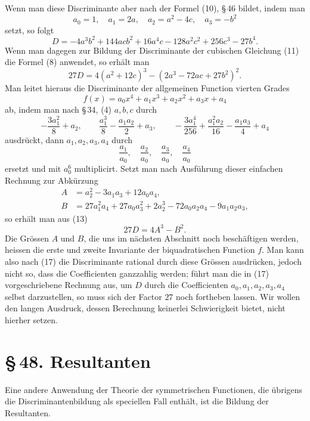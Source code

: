 \documentclass[11pt]{article}
\providecommand{\sect}[2]{\section*{\S\,#1. #2}}
\begin{document}
Wenn man diese Discriminante aber nach der Formel (10), \S\,46 bildet, indem man
\[
 a_0=1,\quad a_1=2a,\quad a_2=a^2-4c,\quad a_3=-b^2
\]
setzt, so folgt
\begin{equation}
D=-4a^3b^2+144acb^2+16a^4c-128a^2c^2+256c^3-27b^4.
\tag{12}
\end{equation}
Wenn man dagegen zur Bildung der Discriminante der cubischen Gleichung (11) die Formel (8) anwendet, so erhält man
\begin{equation}
27D=4(a^2+12c)^3-(2a^3-72ac+27b^2)^2.
\tag{13}
\end{equation}
Man leitet hieraus die Discriminante der allgemeinen Function vierten Grades
\begin{equation}
f(x)=a_0x^4+a_1x^3+a_2x^2+a_3x+a_4
\tag{14}
\end{equation}
ab, indem man nach \S\,34, (4) $a,b,c$ durch
\[
 -\frac{3a_1^2}{8}+a_2,\qquad
 \frac{a_1^3}{8}-\frac{a_1a_2}{2}+a_3,
\qquad
 -\frac{3a_1^4}{256}+\frac{a_1^2a_2}{16}-\frac{a_1a_3}{4}+a_4
\]
ausdrückt, dann $a_1,a_2,a_3,a_4$ durch
\[
\frac{a_1}{a_0},\quad \frac{a_2}{a_0},\quad \frac{a_3}{a_0},\quad \frac{a_4}{a_0}
\]
ersetzt und mit $a_0^6$ multiplicirt. Setzt man nach Ausführung dieser einfachen Rechnung zur Abkürzung
\begin{align}
A&=a_2^2-3a_1a_3+12a_0a_4,
\tag{15}\\
B&=27a_1^2a_4+27a_0a_3^2+2a_2^3-72a_0a_2a_4-9a_1a_2a_3,
\tag{16}
\end{align}
so erhält man aus (13)
\begin{equation}
27D=4A^3-B^2.
\tag{17}
\end{equation}
Die Grössen $A$ und $B$, die uns im nächsten Abschnitt noch beschäftigen werden, heissen die erste und zweite Invariante der biquadratischen Function $f$. Man kann also nach (17) die Discriminante rational durch diese Grössen ausdrücken, jedoch nicht so, dass die Coefficienten ganzzahlig werden; führt man die in (17) vorgeschriebene Rechnung aus, um $D$ durch die Coefficienten $a_0,a_1,a_2,a_3,a_4$ selbst darzustellen, so muss sich der Factor $27$ noch fortheben lassen. Wir wollen den langen Ausdruck, dessen Berechnung keinerlei Schwierigkeit bietet, nicht hierher setzen.

\sect{48}{Resultanten}

Eine andere Anwendung der Theorie der symmetrischen Functionen, die übrigens die Discriminantenbildung als speciellen Fall enthält, ist die Bildung der Resultanten.
\end{document}
